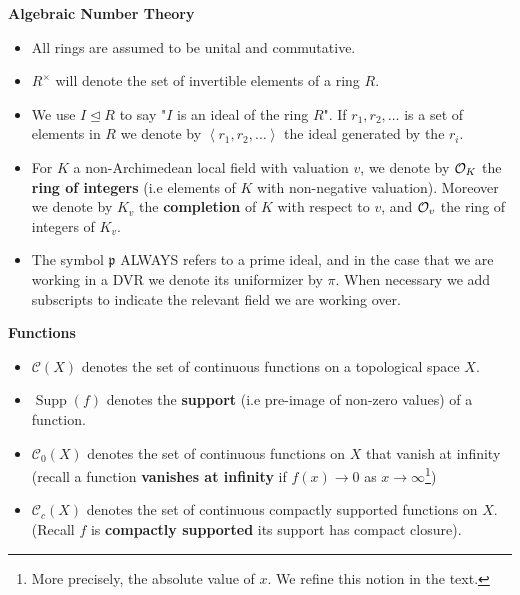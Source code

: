 \documentclass[11pt, x11names, openany]{book}
\newcommand{\pp}{\mathfrak{p}}
\newcommand{\fanc}{\mathscr{C}}
\newcommand{\brangle}[1]{\left\langle #1 \right\rangle}
\newcommand{\ideal}{\trianglelefteq}
\DeclareMathOperator{\supp}{Supp}
\begin{document}
\textbf{Algebraic Number Theory}
\begin{itemize}
    \item All rings are assumed to be unital and commutative.
    \item $R^\times$ will denote the set of invertible elements of a ring $R$.
    \item We use $I \ideal R$ to say "$I$ is an ideal of the ring $R$". If $r_1, r_2, \ldots$ is a set of elements in $R$ we denote by $\brangle{r_1, r_2, \ldots}$ the ideal generated by the $r_i$.
    \item For $K$ a non-Archimedean local field with valuation $v$, we denote by $\mathcal{O}_K$ the \textbf{ring of integers} (i.e elements of $K$ with non-negative valuation). Moreover we denote by $K_v$ the \textbf{completion} of $K$ with respect to $v$, and $\mathcal{O}_v$ the ring of integers of $K_v$.
    \item The symbol $\pp$ ALWAYS refers to a prime ideal, and in the case that we are working in a DVR we denote its uniformizer by $\pi$. When necessary we add subscripts to indicate the relevant field we are working over.
\end{itemize}

\textbf{Functions}
\begin{itemize}
    \item $\fanc(X)$ denotes the set of continuous functions on a topological space $X$.
    \item $\supp(f)$ denotes the \textbf{support} (i.e pre-image of non-zero values) of a function.
    \item $\fanc_0(X)$ denotes the set of continuous functions on $X$ that vanish at infinity (recall a function \textbf{vanishes at infinity} if $f(x) \to 0$ as $x \to \infty$\footnote{More precisely, the absolute value of $x$. We refine this notion in the text.})
    \item $\fanc_c(X)$ denotes the set of continuous compactly supported functions on $X$. (Recall $f$ is \textbf{compactly supported} its support has compact closure).
\end{itemize}
\end{document}
